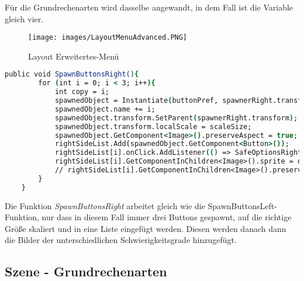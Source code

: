 Für die Grundrechenarten wird dasselbe angewandt, in dem Fall ist die Variable gleich vier.
\begin{figure}[htbp]
  \centering
  \texttt{[image: images/LayoutMenuAdvanced.PNG]}
  \caption{Layout Erweitertes-Menü}
  \label{layoutAdvancedMenu}
\end{figure}
\begin{lstlisting}[language=csh, caption={MenuPickLevelAdvanced.cs SpawnButtonsRight-Funktion}]
	public void SpawnButtonsRight(){
		for (int i = 0; i < 3; i++){
			int copy = i;
			spawnedObject = Instantiate(buttonPref, spawnerRight.transform.position, Quaternion.identity);
			spawnedObject.name += i;
			spawnedObject.transform.SetParent(spawnerRight.transform);
			spawnedObject.transform.localScale = scaleSize;
			spawnedObject.GetComponent<Image>().preserveAspect = true;
			rightSideList.Add(spawnedObject.GetComponent<Button>());
			rightSideList[i].onClick.AddListener(() => SafeOptionsRight(copy));
			rightSideList[i].GetComponentInChildren<Image>().sprite = difficulty[i];
			// rightSideList[i].GetComponentInChildren<Image>().preserveAspect = true;
		}
	}
\end{lstlisting}
Die Funktion \textit{SpawnButtonsRight} arbeitet gleich wie die SpawnButtonsLeft-Funktion, nur dass in diesem Fall immer drei Buttons gespawnt, auf die richtige Größe skaliert und in eine Liste eingefügt werden. Diesen werden danach dann die Bilder der unterschiedlichen Schwierigkeitsgrade hinzugefügt.
\subsection{Szene - Grundrechenarten}
